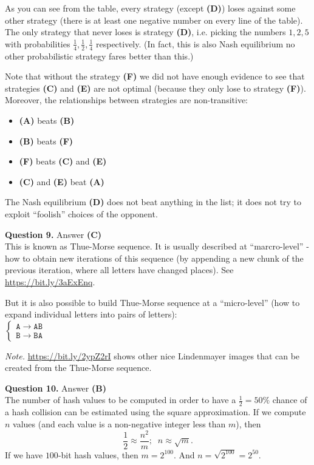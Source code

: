\documentclass[jou]{apa6}
\begin{document}
As you can see from the table, every strategy (except {\bf (D)}) 
loses against some other strategy (there is at least one negative
number on every line of the table). The only strategy that never loses
is strategy {\bf (D)}, i.e. picking the numbers $1,2,5$ with probabilities
$\frac{1}{4}, \frac{1}{2}, \frac{1}{4}$ respectively. 
(In fact, this is also Nash equilibrium \textendash{} no other
probabilistic strategy fares better than this.)

Note that without the strategy {\bf (F)} we did not have enough 
evidence to see that strategies {\bf (C)} and {\bf (E)}
are not optimal (because they only lose to strategy {\bf (F)}). 
Moreover, the relationships between strategies are non-transitive:
\begin{itemize}
\item {\bf (A)} beats {\bf (B)}
\item {\bf (B)} beats {\bf (F)}
\item {\bf (F)} beats {\bf (C)} and {\bf (E)}
\item {\bf (C)} and {\bf (E)} beat {\bf (A)}
\end{itemize}

The Nash equilibrium {\bf (D)} does not beat anything in the list; 
it does not try to exploit ``foolish'' choices of the
opponent.

\vspace{10pt}
{\bf Question 9.} Answer {\bf (C)}\\
This is known as Thue-Morse sequence. It is usually described at ``marcro-level'' - how to obtain 
new iterations of this sequence (by appending a new chunk of the previous iteration, where
all letters have changed places). See \url{https://bit.ly/3aExEnq}.

But it is also possible to build Thue-Morse sequence at a ``micro-level'' (how to expand individual letters into 
pairs of letters):\\ 
${\displaystyle \left\{ \begin{array}{l}
\mathtt{A} \rightarrow \mathtt{AB}\\
\mathtt{B} \rightarrow \mathtt{BA}
\end{array} \right. }$

{\em Note.} \url{https://bit.ly/2ypZ2rI} shows other nice
Lindenmayer images that can be created from the Thue-Morse sequence.


\vspace{10pt}
{\bf Question 10.} Answer {\bf (B)}\\
The number of hash values to be computed in order to have a $\frac{1}{2} = 50\%$ chance of a hash collision 
can be estimated using the square approximation. If we compute $n$ values (and each value is 
a non-negative integer less than $m$), then
$$\frac{1}{2} \approx \frac{n^2}{m};\;\;n \approx \sqrt{m}.$$
If we have $100$-bit hash values, then $m = 2^{100}$. And $n = \sqrt{2^{100}} = 2^{50}$. 
\end{document}
